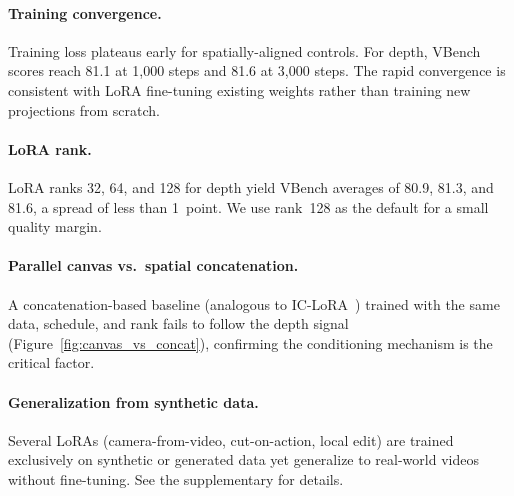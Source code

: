 \paragraph{Training convergence.}
Training loss plateaus early for spatially-aligned controls. For depth, VBench scores reach 81.1 at 1{,}000 steps and 81.6 at 3{,}000 steps. The rapid convergence is consistent with LoRA fine-tuning existing weights rather than training new projections from scratch.

\paragraph{LoRA rank.}
LoRA ranks 32, 64, and 128 for depth yield VBench averages of 80.9, 81.3, and 81.6, a spread of less than 1~point. We use rank~128 as the default for a small quality margin.

\paragraph{Parallel canvas vs.\ spatial concatenation.}
A concatenation-based baseline (analogous to IC-LoRA~\cite{huang2024iclora}) trained with the same data, schedule, and rank fails to follow the depth signal (Figure~\ref{fig:canvas_vs_concat}), confirming the conditioning mechanism is the critical factor.

\paragraph{Generalization from synthetic data.}
Several LoRAs (camera-from-video, cut-on-action, local edit) are trained exclusively on synthetic or generated data yet generalize to real-world videos without fine-tuning. See the supplementary for details.

